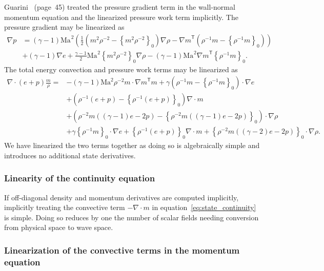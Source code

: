 \documentclass[letterpaper,11pt,nointlimits,reqno,draft]{amsart}
\newcommand{\trans}[1]{{#1}^{\ensuremath{\mathsf{T}}}}
\newcommand{\Mach}[1][]{\ensuremath{\mbox{Ma}_{#1}}}
\newcommand{\reference}[1]{\ensuremath{\left\{#1\right\}_{0}}}
\newcommand{\lessreference}[1]
  {\ensuremath{\left({#1}-\reference{#1}\right)}}
\begin{document}
Guarini~\cite{Guarini1998} (page~45) treated the pressure gradient term in the
wall-normal momentum equation and the linearized pressure work term implicitly.
The pressure gradient may be linearized as
\begin{align}
  \nabla{}p &= \left(\gamma-1\right)\Mach^{2}\left(
      \frac{1}{2} \lessreference{m^{2}\rho^{-2}}\nabla\rho
    - \trans{\nabla{}m}\lessreference{\rho^{-1}m}
  \right)
\\
&+ \left(\gamma-1\right) \nabla{}e
 + \frac{\gamma-1}{2}\Mach^{2} \reference{m^{2}\rho^{-2}}\nabla\rho
 - \left(\gamma-1\right)\Mach^{2} \trans{\nabla{}m}\reference{\rho^{-1}m}
 .
\end{align}
The total energy convection and pressure work terms may be linearized as
\begin{align}
\nabla\cdot\left(e+p\right)\frac{m}{\rho} =
   &- \left(\gamma-1\right)\mbox{Ma}^{2}\rho^{-2}m\cdot \trans{\nabla{}m}m
    + \gamma\lessreference{ \rho^{-1}m }\cdot\nabla{}e
  \\
   &+ \lessreference{
        \rho^{-1}\left(e+p\right)
      } \nabla\cdot{}m
  \\
   &+ \lessreference{
        \rho^{-2}m\left(\left(\gamma-1\right)e-2p\right)
      }\cdot\nabla\rho
  \\
   &+ \gamma\reference{
        \rho^{-1}m
      }\cdot\nabla{}e
    + \reference{
        \rho^{-1}\left(e+p\right)
      }\nabla\cdot{}m
    + \reference{
        \rho^{-2}m\left(\left(\gamma-2\right)e-2p\right)
      }\cdot\nabla\rho
.
\end{align}
We have linearized the two terms together as doing so is algebraically simple
and introduces no additional state derivatives.

\subsubsection{Linearity of the continuity equation}
\label{sec:contconv}

If off-diagonal density and momentum derivatives are computed implicitly,
implicitly treating the convective term $-\nabla\cdot{}m$ in
equation~\eqref{eq:state_continuity} is simple.  Doing so reduces by one the
number of scalar fields needing conversion from physical space to wave space.

\subsubsection{Linearization of the convective terms in the momentum equation}
\label{sec:momtconv}
\end{document}
